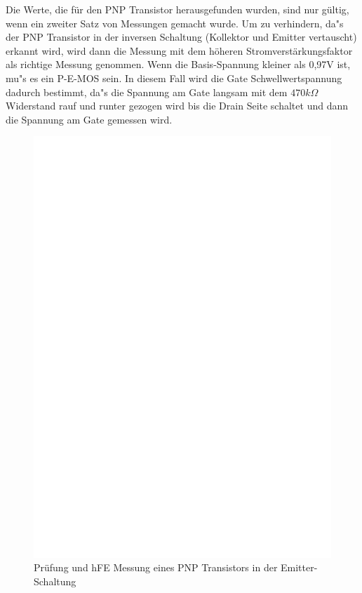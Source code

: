 Die Werte, die f\"ur den PNP Transistor herausgefunden wurden, sind nur g\"ultig, wenn ein zweiter Satz
von Messungen gemacht wurde.
Um zu verhindern, da"s der PNP Transistor in der inversen Schaltung (Kollektor und Emitter vertauscht) erkannt
wird, wird dann die Messung mit dem h\"oheren Stromverst\"arkungsfaktor als richtige Messung genommen.
Wenn die Basis-Spannung kleiner als 0,97V ist, mu"s es ein P-E-MOS sein.
In diesem Fall wird die Gate Schwellwertspannung dadurch bestimmt, da"s die Spannung am Gate langsam mit dem
 \(470k\Omega\) Widerstand rauf und runter gezogen wird bis die Drain Seite schaltet und dann
die Spannung am Gate gemessen wird.

\begin{figure}[H]
\centering
\includegraphics[]{../FIG/PNPce.eps}
\caption{Pr\"ufung und hFE Messung eines PNP Transistors in der Emitter-Schaltung}
\label{fig:pnpce}
\end{figure}

